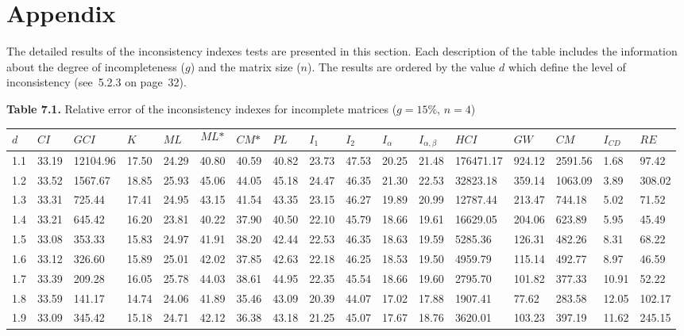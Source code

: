 \chapter{Appendix}

The detailed results of the inconsistency indexes tests are presented in this section. Each description of the table includes the information about the degree of incompleteness ($g$) and the matrix size ($n$). The results are ordered by the value $d$ which define the level of inconsistency (see~5.2.3 on page~32).





\newpage
\textbf{Table 7.1.} Relative error of the inconsistency indexes for incomplete matrices ($g=15\%$, $n=4$)
\begin{adjustbox}{angle=90}
  \begin{center}
    \small{
    \begin{tabular}{|l|llllllllllllllll|}
      \hline $d$&$\textit{CI}$&$\textit{GCI}$&$K$&$\textit{ML}$&$$\textit{ML*}$$&$\textit{CM*}$&$\textit{PL}$&$\textit{I}_1$&$\textit{I}_2$&$\textit{I}_{\alpha}$&$\textit{I}_{\alpha,\beta}$&$\textit{HCI}$&$\textit{GW}$&$\textit{CM}$&$\textit{I}_{CD}$&$\textit{RE}$\\ \hline \hline
1.1&33.19&12104.96&17.50&24.29&40.80&40.59&40.82&23.73&47.53&20.25&21.48&176471.17&924.12&2591.56&1.68&97.42  \\ 
1.2&33.52&1567.67&18.85&25.93&45.06&44.05&45.18&24.47&46.35&21.30&22.53&32823.18&359.14&1063.09&3.89&308.02  \\ 
1.3&33.31&725.44&17.41&24.95&43.15&41.54&43.35&23.15&46.27&19.89&20.99&12787.44&213.47&744.18&5.02&71.52  \\ 
1.4&33.21&645.42&16.20&23.81&40.22&37.90&40.50&22.10&45.79&18.66&19.61&16629.05&204.06&623.89&5.95&45.49  \\ 
1.5&33.08&353.33&15.83&24.97&41.91&38.20&42.44&22.53&46.35&18.63&19.59&5285.36&126.31&482.26&8.31&68.22  \\ 
1.6&33.12&326.60&15.89&25.01&42.02&37.85&42.63&22.18&46.25&18.53&19.50&4959.79&115.14&492.77&8.97&46.59  \\ 
1.7&33.39&209.28&16.05&25.78&44.03&38.61&44.95&22.35&45.54&18.66&19.60&2795.70&101.82&377.33&10.91&52.22  \\ 
1.8&33.59&141.17&14.74&24.06&41.89&35.46&43.09&20.39&44.07&17.02&17.88&1907.41&77.62&283.58&12.05&102.17  \\ 
1.9&33.09&345.42&15.18&24.71&42.12&36.38&43.18&21.25&45.07&17.67&18.76&3620.01&103.23&397.19&11.62&245.15  \\ 

\end{tabular}}
\end{center}
\end{adjustbox}
